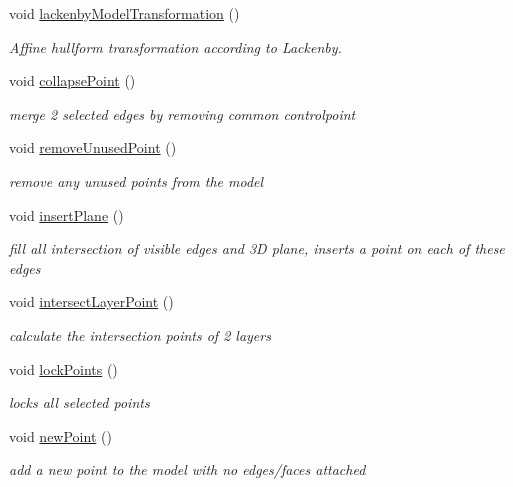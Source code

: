 \begin{DoxyCompactItemize}
void \hyperlink{classShipCAD_1_1Controller_a1008c0cde2f16e883fbe6a07850ba670}{lackenby\+Model\+Transformation} ()
\begin{DoxyCompactList}\small\item\em Affine hullform transformation according to Lackenby. \end{DoxyCompactList}\item 
void \hyperlink{classShipCAD_1_1Controller_a014673c39abcced0285f8df64842918e}{collapse\+Point} ()
\begin{DoxyCompactList}\small\item\em merge 2 selected edges by removing common controlpoint \end{DoxyCompactList}\item 
void \hyperlink{classShipCAD_1_1Controller_a42d9eb4cf3864ca9057bfa45c1c80d40}{remove\+Unused\+Point} ()
\begin{DoxyCompactList}\small\item\em remove any unused points from the model \end{DoxyCompactList}\item 
void \hyperlink{classShipCAD_1_1Controller_aed43429330b5062ddb98372406a02d2d}{insert\+Plane} ()
\begin{DoxyCompactList}\small\item\em fill all intersection of visible edges and 3D plane, inserts a point on each of these edges \end{DoxyCompactList}\item 
void \hyperlink{classShipCAD_1_1Controller_a2a4079dc0201ed5e22776fbe942143f2}{intersect\+Layer\+Point} ()
\begin{DoxyCompactList}\small\item\em calculate the intersection points of 2 layers \end{DoxyCompactList}\item 
void \hyperlink{classShipCAD_1_1Controller_ad447a70b9f88ca1b9a81492fc3b86e2b}{lock\+Points} ()
\begin{DoxyCompactList}\small\item\em locks all selected points \end{DoxyCompactList}\item 
void \hyperlink{classShipCAD_1_1Controller_a0770afe637ab88118b6957f20ceb8942}{new\+Point} ()
\begin{DoxyCompactList}\small\item\em add a new point to the model with no edges/faces attached \end{DoxyCompactList}\item 

\end{DoxyCompactItemize}
